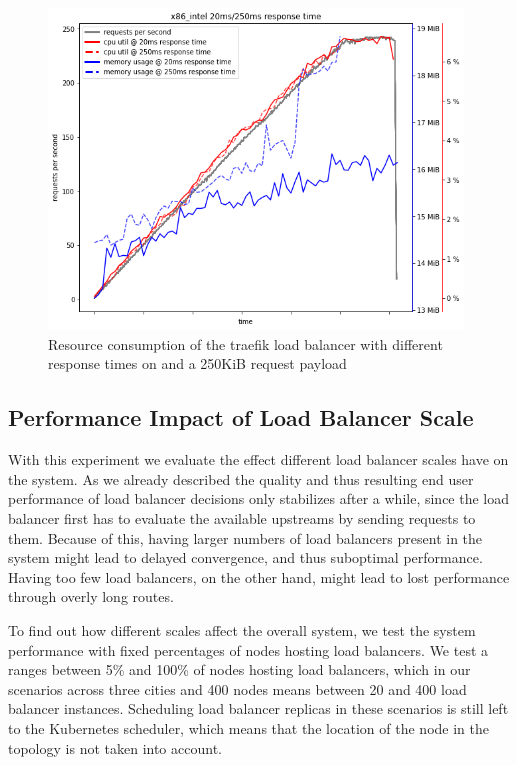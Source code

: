 \documentclass[draft,final]{vutinfth} %
\begin{document}
\begin{figure}
    \centering
    \includegraphics[width=11cm]{graphics/graphs/lb_resources_by_response_time.png}
    \caption{Resource consumption of the traefik\cite{traefik} load balancer with different response times on and a 250KiB request payload}
    \label{fig:lb_resources_by_rt}
\end{figure}

\subsection{Performance Impact of Load Balancer Scale}
With this experiment we evaluate the effect different load balancer scales have on the system.
As we already described the quality and thus resulting end user performance of load balancer decisions only stabilizes after a while, since the load balancer first has to evaluate the available upstreams by sending requests to them.
Because of this, having larger numbers of load balancers present in the system might lead to delayed convergence, and thus suboptimal performance.
Having too few load balancers, on the other hand, might lead to lost performance through overly long routes.

To find out how different scales affect the overall system, we test the system performance with fixed percentages of nodes hosting load balancers.
We test a ranges between 5\% and 100\% of nodes hosting load balancers, which in our scenarios across three cities and 400 nodes means between 20 and 400 load balancer instances.
Scheduling load balancer replicas in these scenarios is still left to the Kubernetes scheduler, which means that the location of the node in the topology is not taken into account.
\end{document}
